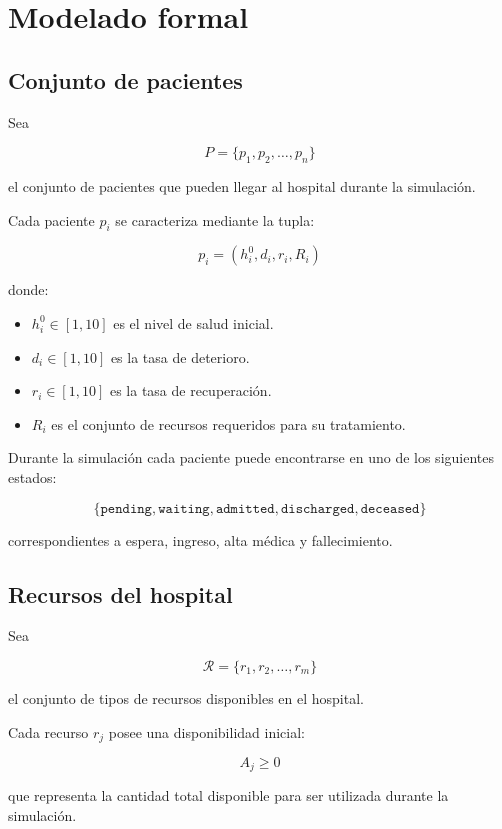\documentclass[12pt,a4paper]{article}
\begin{document}
\section{Modelado formal}

\subsection{Conjunto de pacientes}

Sea

\[
P = \{p_1,p_2,\ldots,p_n\}
\]

el conjunto de pacientes que pueden llegar al hospital durante la simulación.

Cada paciente \(p_i\) se caracteriza mediante la tupla:

\[
p_i =
\left(
h_i^0,
d_i,
r_i,
R_i
\right)
\]

donde:

\begin{itemize}
    \item \(h_i^0 \in [1,10]\) es el nivel de salud inicial.
    \item \(d_i \in [1,10]\) es la tasa de deterioro.
    \item \(r_i \in [1,10]\) es la tasa de recuperación.
    \item \(R_i\) es el conjunto de recursos requeridos para su tratamiento.
\end{itemize}

Durante la simulación cada paciente puede encontrarse en uno de los siguientes estados:

\[
\{\texttt{pending},
\texttt{waiting},
\texttt{admitted},
\texttt{discharged},
\texttt{deceased}\}
\]

correspondientes a espera, ingreso, alta médica y fallecimiento.

\subsection{Recursos del hospital}

Sea

\[
\mathcal{R} =
\{r_1,r_2,\ldots,r_m\}
\]

el conjunto de tipos de recursos disponibles en el hospital.

Cada recurso \(r_j\) posee una disponibilidad inicial:

\[
A_j \ge 0
\]

que representa la cantidad total disponible para ser utilizada durante la simulación.
\end{document}
